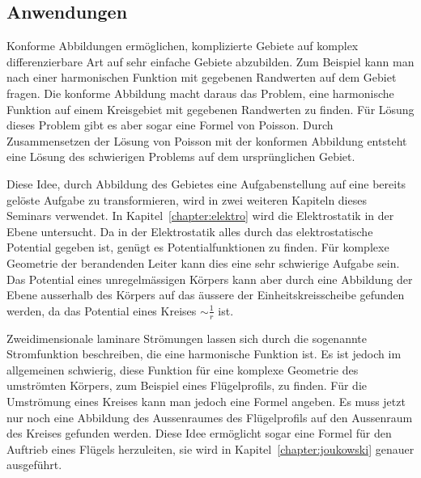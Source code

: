 %
%
%
\subsection{Anwendungen
\label{buch:holomorph:geometrie:subsection:anwendungen}}
Konforme Abbildungen ermöglichen, komplizierte Gebiete auf 
komplex differenzierbare Art auf sehr einfache Gebiete abzubilden.
Zum Beispiel kann man nach einer harmonischen Funktion mit 
gegebenen Randwerten auf dem Gebiet fragen.
Die konforme Abbildung macht daraus das Problem, eine harmonische
Funktion auf einem Kreisgebiet mit gegebenen Randwerten zu finden.
Für Lösung dieses Problem gibt es aber sogar eine Formel von Poisson.
Durch Zusammensetzen der Lösung von Poisson mit der konformen
Abbildung entsteht eine Lösung des schwierigen Problems auf dem
ursprünglichen Gebiet.

Diese Idee, durch Abbildung des Gebietes eine Aufgabenstellung
auf eine bereits gelöste Aufgabe zu transformieren, wird in
zwei weiteren Kapiteln dieses Seminars verwendet.
In Kapitel~\ref{chapter:elektro} wird die Elektrostatik in der
Ebene untersucht.
Da in der Elektrostatik alles durch das elektrostatische Potential
gegeben ist, genügt es Potentialfunktionen zu finden.
Für komplexe Geometrie der berandenden Leiter kann dies eine
sehr schwierige Aufgabe sein.
Das Potential eines unregelmässigen Körpers kann aber durch
eine Abbildung der Ebene ausserhalb des Körpers auf das
äussere der Einheitskreisscheibe gefunden werden,
da das Potential eines Kreises $\sim\frac1r$ ist.

Zweidimensionale laminare Strömungen lassen sich durch die sogenannte
Stromfunktion beschreiben, die eine harmonische Funktion ist.
Es ist jedoch im allgemeinen schwierig, diese Funktion für eine
komplexe Geometrie des umströmten Körpers, zum Beispiel eines Flügelprofils,
zu finden.
Für die Umströmung eines Kreises kann man jedoch eine Formel
angeben.
Es muss jetzt nur noch eine Abbildung des Aussenraumes des Flügelprofils
auf den Aussenraum des Kreises gefunden werden.
Diese Idee ermöglicht sogar eine Formel für den Auftrieb eines Flügels
herzuleiten, sie wird in Kapitel~\ref{chapter:joukowski} genauer
ausgeführt.


